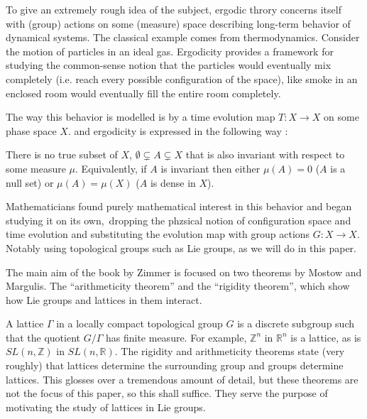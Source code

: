 \documentclass[
  12pt
]{article}
\theoremstyle{break}
\theoremstyle{plain}
\newcommand{\G}{\ensuremath{G}\xspace}
\newcommand{\Gamm}{\ensuremath{\Gamma}\xspace}
\newcommand{\bbr}{\ensuremath{\mathbb{R}}\xspace}
\newcommand{\slnr}{\ensuremath{SL(n, \mathbb{R})}\xspace}
\begin{document}
  To give an extremely rough idea of the subject, ergodic throry concerns itself with (group) actions on some (measure) space
  describing long-term behavior of dynamical systems.
  The classical example comes from thermodynamics. Consider the motion of particles in an ideal gas.
  Ergodicity provides a framework for studying the common-sense notion that the particles would eventually mix completely (i.e. reach every possible configuration of the space),
  like smoke in an enclosed room would eventually fill the entire room completely.

  The way this behavior is modelled is by a time evolution map $T:X \rightarrow X$ on some phase space $X$.
  and ergodicity is expressed in the following way :

  There is no true subset of $X$, $\emptyset \subsetneq A \subsetneq X$ that is also invariant with respect to some measure $\mu$.
  Equivalently, if $A$ is invariant then either $\mu(A) =0$ ($A$ is a null set) or $\mu(A) = \mu(X)$ ($A$ is dense in $X$).

  Mathematicians found purely mathematical interest in this behavior and began studying it on its own,\
  dropping the phzsical notion of configuration space and time evolution and substituting the evolution map with group actions $G:X \rightarrow X$.
  Notably using topological groups such as Lie groups, as we will do in this paper.

  The main aim of the book by Zimmer is focused on two
  theorems by Mostow and Margulis. The ``arithmeticity theorem'' and the
  ``rigidity theorem'', which show how Lie groups and lattices in them
  interact. 

  A lattice \Gamm in a locally compact topological group \G is a discrete subgroup such that the quotient $G/\Gamma$ has finite measure.
  For example, $\mathbb{Z}^n$ in $\bbr^n$ is a lattice, as is $SL(n, \mathbb{Z})$ in $\slnr$.
  The rigidity and arithmeticity theorems state (very roughly) that lattices determine the surrounding group and groups determine lattices.
  This glosses over a tremendous amount of detail, but these theorems are not the focus of this paper, so this shall suffice.
  They serve the purpose of motivating the study of lattices in Lie groups.

\end{document}
